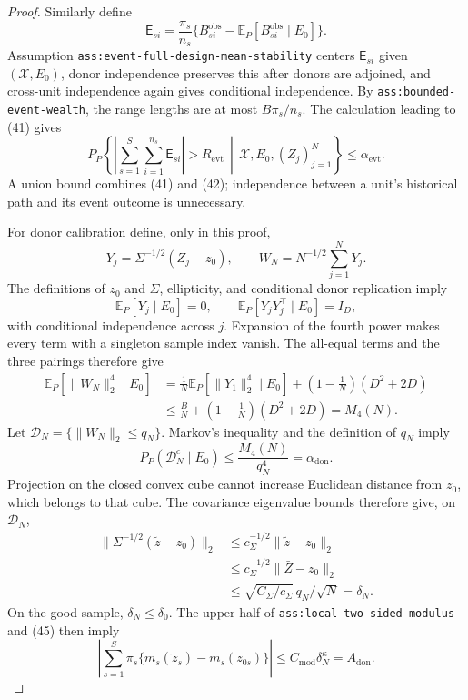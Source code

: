 \documentclass{article}
\begin{document}
\begin{proof}
Similarly define
\[
\mathsf E_{si}=\frac{\pi_s}{n_s}
\{B_{si}^{\mathrm{obs}}-\mathbb E_P[B_{si}^{\mathrm{obs}}\mid E_0]\}.
\]
Assumption \texttt{ass:event-full-design-mean-stability} centers \(\mathsf E_{si}\) given \((\mathscr X,E_0)\), donor independence preserves this after donors are adjoined, and cross-unit independence again gives conditional independence.  By \texttt{ass:bounded-event-wealth}, the range lengths are at most \(B\pi_s/n_s\).  The calculation leading to (41) gives
\[
P_P\!\left\{
\left|\sum_{s=1}^{S}\sum_{i=1}^{n_s}\mathsf E_{si}\right|
>R_{\mathrm{evt}}
\,\middle|\,\mathscr X,E_0,(Z_j)_{j=1}^{N}
\right\}
\leq\alpha_{\mathrm{evt}}.
\tag{42}
\]
A union bound combines (41) and (42); independence between a unit's historical path and its event outcome is unnecessary.

For donor calibration define, only in this proof,
\[
Y_j=\Sigma^{-1/2}(Z_j-z_0),
\qquad
W_N=N^{-1/2}\sum_{j=1}^{N}Y_j.
\]
The definitions of \(z_0\) and \(\Sigma\), ellipticity, and conditional donor replication imply
\[
\mathbb E_P[Y_j\mid E_0]=0,
\qquad
\mathbb E_P[Y_jY_j^\top\mid E_0]=I_D,
\]
with conditional independence across \(j\).  Expansion of the fourth power makes every term with a singleton sample index vanish.  The all-equal terms and the three pairings therefore give
\[
\begin{aligned}
\mathbb E_P[\|W_N\|_2^4\mid E_0]
&=\frac1N\mathbb E_P[\|Y_1\|_2^4\mid E_0]
+\left(1-\frac1N\right)(D^2+2D)\\
&\leq\frac BN+\left(1-\frac1N\right)(D^2+2D)
=M_4(N).
\end{aligned}
\tag{43}
\]
Let \(\mathcal D_N=\{\|W_N\|_2\leq q_N\}\).  Markov's inequality and the definition of \(q_N\) imply
\[
P_P(\mathcal D_N^c\mid E_0)
\leq\frac{M_4(N)}{q_N^4}=\alpha_{\mathrm{don}}.
\tag{44}
\]
Projection on the closed convex cube cannot increase Euclidean distance from \(z_0\), which belongs to that cube.  The covariance eigenvalue bounds therefore give, on \(\mathcal D_N\),
\[
\begin{aligned}
\|\Sigma^{-1/2}(\widetilde z-z_0)\|_2
&\leq c_\Sigma^{-1/2}\|\widetilde z-z_0\|_2\\
&\leq c_\Sigma^{-1/2}\|\bar Z-z_0\|_2\\
&\leq\sqrt{C_\Sigma/c_\Sigma}\,q_N/\sqrt N
=\delta_N.
\end{aligned}
\tag{45}
\]
On the good sample, \(\delta_N\leq\delta_0\).  The upper half of \texttt{ass:local-two-sided-modulus} and (45) then imply
\[
\left|\sum_{s=1}^{S}\pi_s
\{m_s(\widetilde z_s)-m_s(z_{0s})\}\right|
\leq C_{\mathrm{mod}}\delta_N^\kappa=A_{\mathrm{don}}.
\tag{46}
\]


\end{proof}
\end{document}
